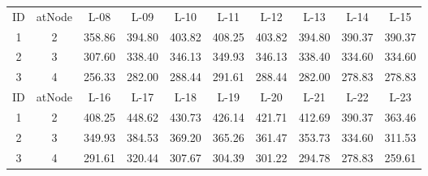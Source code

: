 \documentclass[12pt]{article}
\begin{document}
\begin{table}[h]
\begin{minipage}{\textwidth}
\begin{tabular}{cccccccccc}
ID &	atNode & L-08 & L-09	& L-10	& L-11	& L-12	& L-13	& L-14	& L-15\\[0.5ex]
1	&	2	&	358.86	&	394.80	&	403.82	&	408.25	&	403.82	&	394.80	&	390.37	&	390.37 \\
2	&	3	&	307.60	&	338.40	&	346.13	&	349.93	&	346.13	&	338.40	&	334.60	&	334.60 \\
3	&	4	&	256.33	&	282.00	&	288.44	&	291.61	&	288.44	&	282.00	&	278.83	&	278.83 \\

ID &	atNode & L-16 & L-17	& L-18	& L-19	& L-20	& L-21	& L-22	& L-23\\[0.5ex]
1	&	2	&	408.25	&	448.62	&	430.73	&	426.14	&	421.71	&	412.69	&	390.37	&	363.46 \\ 
2	&	3	&	349.93	&	384.53	&	369.20	&	365.26	&	361.47	&	353.73	&	334.60	&	311.53 \\ 
3	&	4	&	291.61	&	320.44	&	307.67	&	304.39	&	301.22	&	294.78	&	278.83	&	259.61 \\

\hline
\end{tabular}
\end{minipage}
\end{table}
\end{document}
